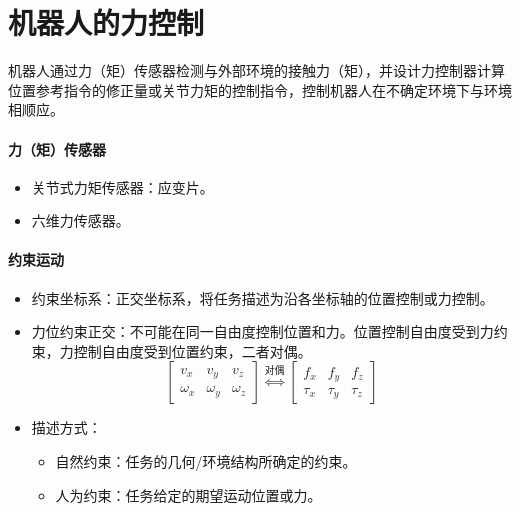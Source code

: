 \documentclass[
12pt, %
a4paper, 
oneside, %
headinclude,footinclude, %
]{scrartcl}
\begin{document}
\section{机器人的力控制}
机器人通过力（矩）传感器检测与外部环境的接触力（矩），并设计力控制器计算位置参考指令的修正量或关节力矩的控制指令，控制机器人在不确定环境下与环境相顺应。
\paragraph{力（矩）传感器}
\begin{itemize}
\item 关节式力矩传感器：应变片。
\item 六维力传感器。
\end{itemize}
\paragraph{约束运动}
\begin{itemize}
\item 约束坐标系：正交坐标系，将任务描述为沿各坐标轴的位置控制或力控制。
\item 力位约束正交：不可能在同一自由度控制位置和力。位置控制自由度受到力约束，力控制自由度受到位置约束，二者对偶。
$$
\begin{bmatrix} v_x & v_y & v_z \\ \omega_x & \omega_y & \omega_z \end{bmatrix}
\overset{\text{对偶}}{\Longleftrightarrow}
\begin{bmatrix} f_x & f_y & f_z \\ \tau_x & \tau_y & \tau_z \end{bmatrix}
$$
\item 描述方式：
\begin{itemize}
\item 自然约束：任务的几何/环境结构所确定的约束。
\item 人为约束：任务给定的期望运动位置或力。
\end{itemize}
\end{itemize}
\end{document}
